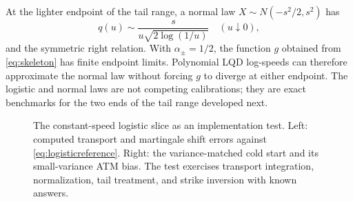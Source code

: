 At the lighter endpoint of the tail range, a normal law
$X\sim N(-s^2/2,s^2)$ has
\[
q(u)\sim\frac{s}{u\sqrt{2\log(1/u)}}\quad(u\downarrow0),
\]
and the symmetric right relation.  With $\alpha_\pm=1/2$, the function $g$
obtained from \eqref{eq:skeleton} has finite endpoint limits.  Polynomial
LQD log-speeds can therefore approximate the normal law without forcing
$g$ to diverge at either endpoint.  The logistic and normal laws are not
competing calibrations; they are exact benchmarks for the two ends of the
tail range developed next.

\begin{figure}[htbp]
\centering
{}
\caption{The constant-speed logistic slice as an implementation test.  Left:
computed transport and martingale shift errors against
\eqref{eq:logisticreference}.  Right: the variance-matched cold start and its
small-variance ATM bias.  The test exercises transport integration,
normalization, tail treatment, and strike inversion with known answers.}
\label{fig:exact}
\end{figure}
